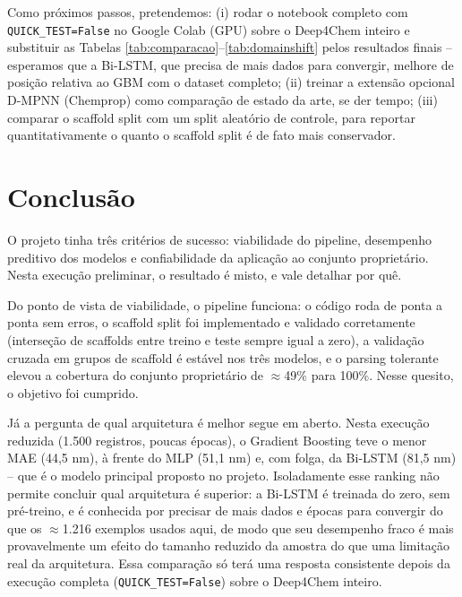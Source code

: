 \documentclass[12pt]{article}
\begin{document}
Como próximos passos, pretendemos: (i) rodar o notebook completo com \texttt{QUICK\_TEST=False} no Google Colab (GPU) sobre o Deep4Chem inteiro e substituir as Tabelas \ref{tab:comparacao}--\ref{tab:domainshift} pelos resultados finais -- esperamos que a Bi-LSTM, que precisa de mais dados para convergir, melhore de posição relativa ao GBM com o dataset completo; (ii) treinar a extensão opcional D-MPNN (Chemprop) como comparação de estado da arte, se der tempo; (iii) comparar o scaffold split com um split aleatório de controle, para reportar quantitativamente o quanto o scaffold split é de fato mais conservador.

\section{Conclusão}

O projeto tinha três critérios de sucesso: viabilidade do pipeline, desempenho preditivo dos modelos e confiabilidade da aplicação ao conjunto proprietário. Nesta execução preliminar, o resultado é misto, e vale detalhar por quê.

Do ponto de vista de viabilidade, o pipeline funciona: o código roda de ponta a ponta sem erros, o scaffold split foi implementado e validado corretamente (interseção de scaffolds entre treino e teste sempre igual a zero), a validação cruzada em grupos de scaffold é estável nos três modelos, e o parsing tolerante elevou a cobertura do conjunto proprietário de $\approx$49\% para 100\%. Nesse quesito, o objetivo foi cumprido.

Já a pergunta de qual arquitetura é melhor segue em aberto. Nesta execução reduzida (1.500 registros, poucas épocas), o Gradient Boosting teve o menor MAE (44,5 nm), à frente do MLP (51,1 nm) e, com folga, da Bi-LSTM (81,5 nm) -- que é o modelo principal proposto no projeto. Isoladamente esse ranking não permite concluir qual arquitetura é superior: a Bi-LSTM é treinada do zero, sem pré-treino, e é conhecida por precisar de mais dados e épocas para convergir do que os $\approx$1.216 exemplos usados aqui, de modo que seu desempenho fraco é mais provavelmente um efeito do tamanho reduzido da amostra do que uma limitação real da arquitetura. Essa comparação só terá uma resposta consistente depois da execução completa (\texttt{QUICK\_TEST=False}) sobre o Deep4Chem inteiro.
\end{document}
